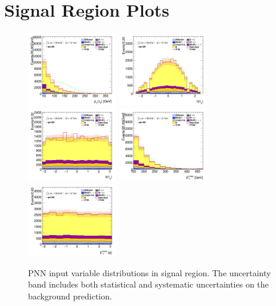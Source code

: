 	\section{\taujets Signal Region Plots}\label{sec:taujet-sr-plots}
		\begin{figure}[!htp]
			\begin{center}    
			\includegraphics[width=0.35\textwidth]{chapters/chapter6_HPlus/images/taujets/tau_0_pt_SR_TAUJET.png}
			\includegraphics[width=0.35\textwidth]{chapters/chapter6_HPlus/images/taujets/tau_0_eta_SR_TAUJET.png} \\
			\includegraphics[width=0.35\textwidth]{chapters/chapter6_HPlus/images/taujets/tau_0_phi_SR_TAUJET.png}
			\includegraphics[width=0.35\textwidth]{chapters/chapter6_HPlus/images/taujets/met_et_SR_TAUJET.png} \\
			\includegraphics[width=0.35\textwidth]{chapters/chapter6_HPlus/images/taujets/met_phi_SR_TAUJET.png} 
			\end{center}
			\caption{
			PNN input variable distributions in \taujets signal region. The uncertainty band includes both statistical and systematic uncertainties on the background prediction. 
			}
			\label{fig:sr-taujets-1}
		\end{figure}

